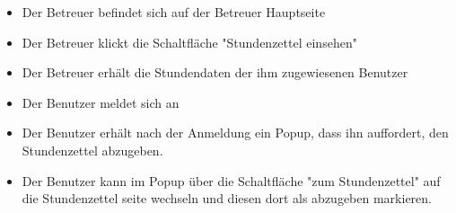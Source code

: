 \begin{requirements}
	\begin{itemize}
		\item Der Betreuer befindet sich auf der Betreuer Hauptseite
		\item Der Betreuer klickt die Schaltfläche "Stundenzettel einsehen"
		\item Der Betreuer erhält die Stundendaten der ihm zugewiesenen Benutzer
	\end {itemize}

            \begin{itemize}
		\item Der Benutzer meldet sich an
		\item Der Benutzer erhält nach der Anmeldung ein Popup, dass ihn auffordert, den Stundenzettel abzugeben.
		\item Der Benutzer kann im Popup über die Schaltfläche "zum Stundenzettel" auf die Stundenzettel seite wechseln und diesen dort als abzugeben markieren.
	\end {itemize}

\end{requirements}